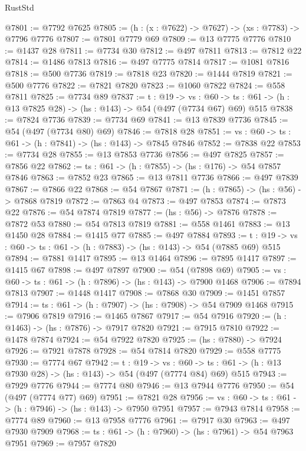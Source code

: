 \begin{lexlean}{RustStd}
\begin{coremodule}
@7801 := @7792 @7625
@7805 := (h : (x : @7622) -> @7627) -> (xs : @7783) -> @7796 @7776
@7807 := @7801 @7779 @69
@7809 := @13 @7775 @7776
@7810 := @1437 @28
@7811 := @7734 @30
@7812 := @497 @7811
@7813 := @7812 @22
@7814 := @1486 @7813
@7816 := @497 @7775 @7814
@7817 := @1081 @7816
@7818 := @500 @7736
@7819 := @7818 @23
@7820 := @1444 @7819
@7821 := @500 @7776
@7822 := @7821 @7820
@7823 := @1060 @7822
@7824 := @558 @7811
@7825 := @7734 @89
@7837 := {t : @19} ->
  {vs : @60} -> {ts : @61} -> (h : @13 @7825 @28) -> (hs : @143) -> @54 (@497 (@7734 @67) @69) @515
@7838 := @7824 @7736
@7839 := @7734 @69
@7841 := @13 @7839 @7736
@7845 := @54 (@497 (@7734 @80) @69)
@7846 := @7818 @28
@7851 := {vs : @60} -> {ts : @61} -> (h : @7841) -> (hs : @143) -> @7845 @7846
@7852 := @7838 @22
@7853 := @7734 @28
@7855 := @13 @7853 @7736
@7856 := @497 @7825
@7857 := @7856 @22
@7862 := {ts : @61} -> (h : @7855) -> (hs : @176) -> @54 @7857 @7846
@7863 := @7852 @23
@7865 := @13 @7811 @7736
@7866 := @497 @7839
@7867 := @7866 @22
@7868 := @54 @7867
@7871 := (h : @7865) -> (hs : @56) -> @7868 @7819
@7872 := @7863 @4
@7873 := @497 @7853
@7874 := @7873 @22
@7876 := @54 @7874 @7819
@7877 := (hs : @56) -> @7876
@7878 := @7872 @53
@7880 := @54 @7813 @7819
@7881 := @558 @1461
@7883 := @13 @1450 @28
@7884 := @1415 @77
@7885 := @497 @7884
@7893 := {t : @19} -> {vs : @60} -> {ts : @61} -> (h : @7883) -> (hs : @143) -> @54 (@7885 @69) @515
@7894 := @7881 @1417
@7895 := @13 @1464
@7896 := @7895 @1417
@7897 := @1415 @67
@7898 := @497 @7897
@7900 := @54 (@7898 @69)
@7905 := {vs : @60} -> {ts : @61} -> (h : @7896) -> (hs : @143) -> @7900 @1468
@7906 := @7894 @7813
@7907 := @1448 @1417
@7908 := @7868 @30
@7909 := @1451 @7857
@7914 := {ts : @61} -> (h : @7907) -> (hs : @7908) -> @54 @7909 @1468
@7915 := @7906 @7819
@7916 := @1465 @7867
@7917 := @54 @7916
@7920 := (h : @1463) -> (hs : @7876) -> @7917 @7820
@7921 := @7915 @7810
@7922 := @1478 @7874
@7924 := @54 @7922 @7820
@7925 := (hs : @7880) -> @7924
@7926 := @7921 @7878
@7928 := @54 @7814 @7820
@7929 := @558 @7775
@7930 := @7774 @67
@7942 := {t : @19} ->
  {vs : @60} -> {ts : @61} -> (h : @13 @7930 @28) -> (hs : @143) -> @54 (@497 (@7774 @84) @69) @515
@7943 := @7929 @7776
@7944 := @7774 @80
@7946 := @13 @7944 @7776
@7950 := @54 (@497 (@7774 @77) @69)
@7951 := @7821 @28
@7956 := {vs : @60} -> {ts : @61} -> (h : @7946) -> (hs : @143) -> @7950 @7951
@7957 := @7943 @7814
@7958 := @7774 @89
@7960 := @13 @7958 @7776
@7961 := @7917 @30
@7963 := @497 @7930 @7909
@7968 := {ts : @61} -> (h : @7960) -> (hs : @7961) -> @54 @7963 @7951
@7969 := @7957 @7820

\end{coremodule}
\end{lexlean}
